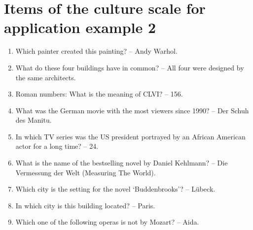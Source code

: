 \documentclass[doc,floatsintext,natbib]{apa7}
\begin{document}
\section{Items of the culture scale for application example 2}
\label{sec:AppendixB}

\begin{enumerate}
\item Which painter created this painting? – Andy Warhol.
\item What do these four buildings have in common? – All four were designed by the same architects.
\item Roman numbers: What is the meaning of CLVI? – 156.
\item What was the German movie with the most viewers since 1990? – Der Schuh des Manitu.
\item In which TV series was the US president portrayed by an African American actor for a long time? – 24.
\item What is the name of the bestselling novel by Daniel Kehlmann? – Die Vermessung der Welt (Measuring The World).
\item Which city is the setting for the novel ‘Buddenbrooks’? – Lübeck.
\item In which city is this building located? – Paris.
\item Which one of the following operas is not by Mozart? – Aida.
\end{enumerate}
\end{document}
